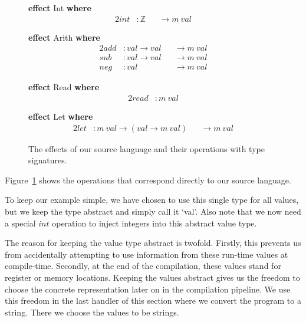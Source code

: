 \documentclass[a4paper,UKenglish,cleveref, autoref, thm-restate]{oasics-v2021}
\begin{document}
\begin{figure}[ht]
\begin{minipage}[t]{0.4\textwidth}
\textbf{effect} Int \textbf{where}
\vspace{-1em}
\begin{alignat*}{2}
  \mathit{int} & : \mathbb{Z} && \to m~\mathit{val}
\end{alignat*}

\textbf{effect} Arith \textbf{where}
\vspace{-1em}
\begin{alignat*}{2}
  \mathit{add} & : \mathit{val} \to \mathit{val} && \to m~\mathit{val} \\
  \mathit{sub} & : \mathit{val} \to \mathit{val} && \to m~\mathit{val} \\
  \mathit{neg} & : \mathit{val}                  && \to m~\mathit{val}
\end{alignat*}
\end{minipage}%
%
\begin{minipage}[t]{0.6\textwidth}
\textbf{effect} Read \textbf{where}
\vspace{-1em}
\begin{alignat*}{2}
  \mathit{read} & : m~\mathit{val}
\end{alignat*}

\textbf{effect} Let \textbf{where}
\vspace{-1em}
\begin{alignat*}{2}
  \mathit{let} & : m~\mathit{val} \to (\mathit{val} \to m~\mathit{val}) && \to m~\mathit{val}
\end{alignat*}
\end{minipage}
  \caption{The effects of our source language and their operations with type signatures.}\label{fig:source-ops}
\end{figure}

Figure~\ref{fig:source-ops} shows the operations that correspond directly to our source language.

To keep our example simple, we have chosen to use this single type for all values, but we keep the type abstract and simply call it `val'.
Also note that we now need a special $\mathit{int}$ operation to inject integers into this abstract value type.

The reason for keeping the value type abstract is twofold. 
Firstly, this prevents us from accidentally attempting to use information from these run-time values at compile-time. 
Secondly, at the end of the compilation, these values stand for register or memory locations.
Keeping the values abstract gives us the freedom to choose the concrete representation later on in the compilation pipeline.
We use this freedom in the last handler of this section where we convert the program to a string.
There we choose the values to be strings.
\end{document}
